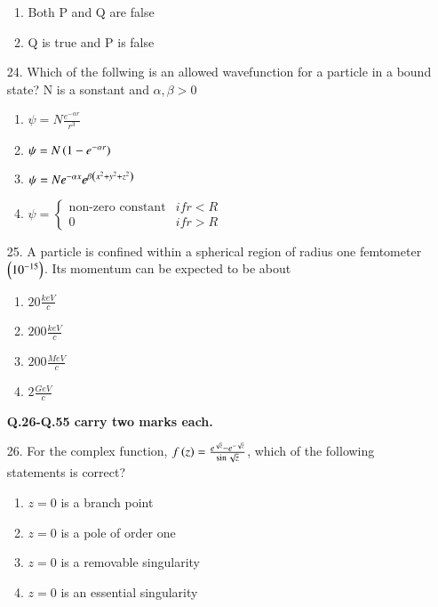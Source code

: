 \documentclass[journal]{IEEEtran}
\begin{document}
\begin{enumerate}
\begin{enumerate}[label=(\Alph*)]
        \item Both P and Q are false
        \item Q is true and P is false
     \end{enumerate}
    \item[24.] Which of the follwing is an allowed wavefunction for a particle in a bound state? N is a sonstant and $\alpha,\beta>0$
    \begin{enumerate}[label=(\Alph*)]
        \item $\psi=N\frac{e^{-\alpha r}}{r^3}$
        \item $\psi=N\left(1-e^{-\alpha r}\right)$
        \item $\psi=Ne^{-\alpha x}e^{\beta\left(x^2+y^2+z^2\right)}$
        \item $\psi=\begin{cases}\text{non-zero constant} & if r<R\\0 & if r>R\end{cases}$
    \end{enumerate}
    \item[25.] A particle is confined within a spherical region of radius one femtometer $\left(10^{-15}\right)$. Its momentum can be expected to be about
    \begin{enumerate}[label=(\Alph*)]
        \item $20\frac{keV}{c}$
        \item $200\frac{keV}{c}$
        \item $200\frac{MeV}{c}$
        \item $2\frac{GeV}{c}$
    \end{enumerate}
    \textbf{Q.26-Q.55 carry two marks each.}
    \item[26.] For the complex function, $f\left(z\right)=\frac{e^{\sqrt{z}}-e^{-\sqrt{z}}}{\sin \sqrt{z}}$, which of the following statements is correct?
    \begin{enumerate}[label=(\Alph*)]
        \item $z=0$ is a branch point
        \item $z=0$ is a pole of order one
        \item $z=0$ is a removable singularity
        \item $z=0$ is an essential singularity
    \end{enumerate} 
\end{enumerate}
\end{document}
